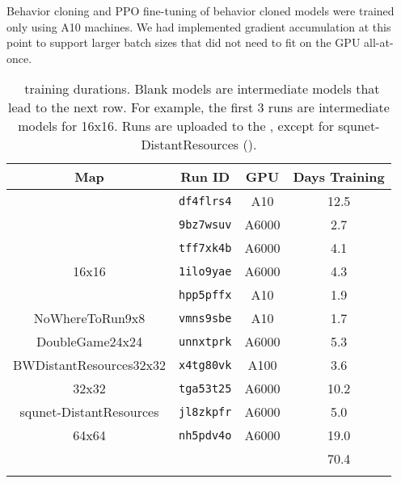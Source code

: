\documentclass[conference,onecolumn]{IEEEtran}
\newcounter{supptable}
\newenvironment{supptable}
  {\renewcommand{\tablename}{Supplemental Table}\setcounter{table}{\value{supptable}}\addtocounter{supptable}{1}\begin{table}}
  {\end{table}\setcounter{supptable}{\value{table}}}
\begin{document}
Behavior cloning and PPO fine-tuning of behavior cloned models were trained only using
A10 machines. We had implemented gradient accumulation at this point to support larger
batch sizes that did not need to fit on the GPU all-at-once.

\label{appendix:training-durations}
\begin{supptable}[H]
    \caption{\agentName\ training durations. Blank models are intermediate models that
    lead to the next row. For example, the first 3 runs are intermediate models for
    16x16. Runs are uploaded to the \wbProject, except
    for squnet-DistantResources (\microRTSWBProjectPath).}
    \label{tab:training-durations}
    \begin{center}
    \begin{tabular}{lccc}
        \multicolumn{1}{c}{Map} & Run ID & GPU & Days Training \\
        \midrule
         & \texttt{df4flrs4} & A10 & 12.5 \\
         & \texttt{9bz7wsuv} & A6000 & 2.7 \\
         & \texttt{tff7xk4b} & A6000 & 4.1 \\
        \multicolumn{1}{c}{16x16} & \texttt{1ilo9yae} & A6000 & 4.3 \\
         \hline
         & \texttt{hpp5pffx} & A10 & 1.9 \\
        \multicolumn{1}{c}{NoWhereToRun9x8} & \texttt{vmns9sbe} & A10 & 1.7 \\
         \hline
        \multicolumn{1}{c}{DoubleGame24x24} & \texttt{unnxtprk} & A6000 & 5.3 \\
         \hline
        \multicolumn{1}{c}{BWDistantResources32x32} & \texttt{x4tg80vk} & A100 & 3.6 \\
         \hline
        \multicolumn{1}{c}{32x32} & \texttt{tga53t25} & A6000 & 10.2 \\
        \multicolumn{1}{c}{squnet-DistantResources} & \texttt{jl8zkpfr} & A6000 & 5.0 \\
         \hline
        \multicolumn{1}{c}{64x64} & \texttt{nh5pdv4o} & A6000 & 19.0 \\
        \hline
         & \multicolumn{1}{l}{} & \multicolumn{1}{l}{} & 70.4 \\
         & \multicolumn{1}{l}{} & \multicolumn{1}{l}{} & \multicolumn{1}{l}{}
        \end{tabular}
\end{center}
\end{supptable}
\end{document}
